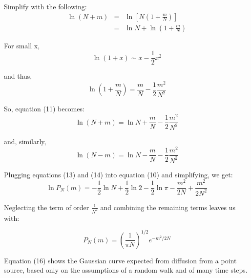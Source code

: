 \documentclass[draft, jgrga]{AGUTeX}
\begin{document}
\begin{article}
Simplify with the following:
\begin{eqnarray}
\ln(N+m) & = & \ln \left[ N \left( 1 + \frac{m}{N} \right)\right] \\
 & = & \ln N + \ln \left(1+\frac{m}{N}\right) \nonumber
\end{eqnarray}

For small x,
\begin{equation}
\ln(1+x) \sim x - \frac{1}{2}x^2 \nonumber
\end{equation}

and thus,
\begin{equation}
\ln \left(1+\frac{m}{N}\right) = \frac{m}{N} - \frac{1}{2}\frac{m^2}{N^2}
\end{equation}

So, equation (11) becomes:
\begin{equation}
\ln(N+m) = \ln N + \frac{m}{N} - \frac{1}{2}\frac{m^2}{N^2}
\end{equation}

and, similarly,
\begin{equation}
\ln(N-m) = \ln N - \frac{m}{N} - \frac{1}{2}\frac{m^2}{N^2}
\end{equation}

Plugging equations (13) and (14) into equation (10) and simplifying, we get:
 \begin{equation}
 \ln P_N(m) = - \frac{1}{2} \ln N + \frac{1}{2} \ln 2 - \frac{1}{2} \ln \pi
- \frac{m^2}{2N} + \frac {m^2}{2N^2}
\end{equation}

Neglecting the term of order \begin{math} \frac{1}{N^2} \end{math} and combining the remaining terms leaves us with:

\begin{equation}
P_N(m) = \left( \frac{1}{\pi N} \right)^{1/2} e^{-m^2/2N}
\end{equation}

Equation (16) shows the Gaussian curve expected from diffusion from a point source, based only on the assumptions of a random walk and of many time steps.


\end{article}
\end{document}

